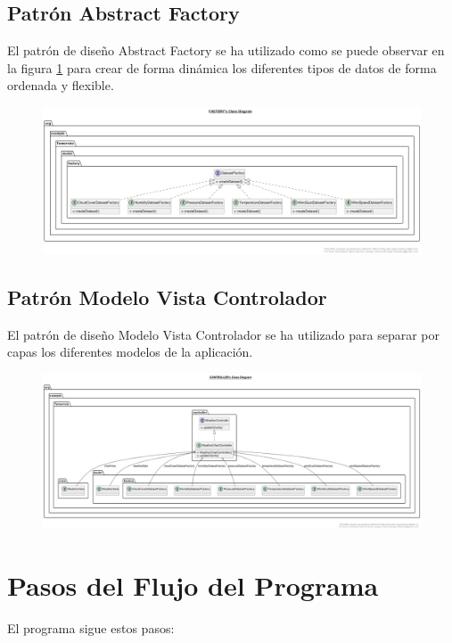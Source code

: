 \documentclass{article}
\begin{document}
\subsection{Patrón Abstract Factory}
El patrón de diseño Abstract Factory se ha utilizado como se puede observar en la figura \ref{fig:image7} para crear de forma dinámica los diferentes tipos de datos de forma ordenada y flexible.

\begin{figure}[H]
  \centering
  \includegraphics[width=1.1\textwidth]{images/image7.png}
  \label{fig:image7}
\end{figure}

\subsection{Patrón Modelo Vista Controlador}
El patrón de diseño Modelo Vista Controlador se ha utilizado para separar por capas los diferentes modelos de la aplicación.

\begin{figure}[H]
  \centering
  \includegraphics[width=1.1\textwidth]{images/image3.png}
  \label{fig:image3}
\end{figure}

\section{Pasos del Flujo del Programa}
El programa sigue estos pasos:
\end{document}
